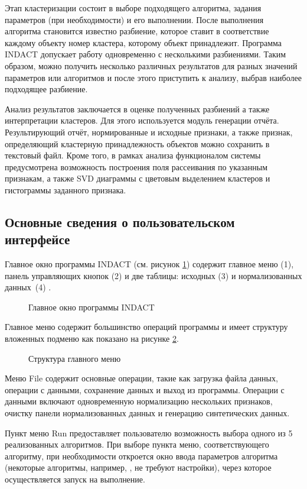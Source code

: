 \documentclass[12pt]{diploma}
\begin{document}
	Этап кластеризации состоит в выборе подходящего алгоритма, задания параметров (при необходимости) и его выполнении. После выполнения алгоритма становится известно разбиение, которое ставит в соответствие каждому объекту номер кластера, которому объект принадлежит. Программа INDACT допускает работу одновременно с несколькими разбиениями. Таким образом, можно получить несколько различных результатов для разных значений параметров или алгоритмов и после этого приступить к анализу, выбрав наиболее подходящее разбиение. 
	
	Анализ результатов заключается в оценке полученных разбиений а также интерпретации кластеров. Для этого используется модуль генерации отчёта. Результирующий отчёт, нормированные и исходные признаки, а также признак, определяющий кластерную принадлежность объектов можно сохранить в текстовый файл. Кроме того, в рамках анализа функционалом системы предусмотрена возможность построения поля рассеивания по указанным признакам, а также  SVD диаграммы с цветовым выделением кластеров и гистограммы заданного признака.
	
	\subsection{Основные сведения о пользовательском интерфейсе}
	
	Главное окно программы INDACT (см. рисунок \ref{fig:main-gui}) содержит главное меню (1), панель  управляющих кнопок (2) и две таблицы: исходных (3) и нормализованных данных~(4) . 
	\begin{figure}[h!]
		\centering
						
		\caption{Главное окно программы INDACT}
		\label{fig:main-gui}
	\end{figure}
	\newpage
	Главное меню содержит большинство операций программы и имеет структуру вложенных подменю как показано на рисунке \ref{fig:menu}. 
	\begin{figure}[h!]
		\centering
						
		\caption{Структура главного меню}
		\label{fig:menu}
	\end{figure}
	
	Меню File содержит основные операции, такие как загрузка файла данных, операции с данными, сохранение данных и выход из программы. Операции с данными включают одновременную нормализацию нескольких признаков, очистку панели нормализованных данных и генерацию синтетических данных. 
	
	Пункт меню Run предоставляет пользователю возможность выбора одного из 5 реализованных алгоритмов. При выборе пункта меню, соответствующего алгоритму, при необходимости откроется окно ввода параметров алгоритма (некоторые алгоритмы, например, \dePDDP, не требуют настройки), через которое осуществляется запуск на выполнение.
	
\end{document}
